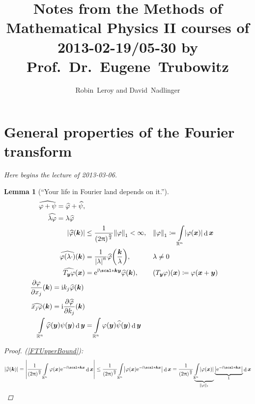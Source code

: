 \documentclass[10pt]{article}
\title{Notes from the Methods of Mathematical Physics II courses of 2013-02-19{\slash}05-30 by Prof.~Dr.~Eugene~Trubowitz}
\author{Robin~Leroy and David~Nadlinger}
\newtheorem*{lemma}{Lemma}
\DeclarePairedDelimiter\norm{\Vert}{\Vert}
\DeclarePairedDelimiter\abs{\lvert}{\rvert}
\DeclarePairedDelimiter\of{\lparen}{\rparen}
\newcommand{\R}{\mathbb{R}}
\newcommand{\Rn}{{\R^n}}
\DeclareMathOperator{\diffd}{d}
\newcommand\gl\lambda
\newcommand\gj\varphi
\newcommand\gy\psi
\newcommand{\bx}{{\vectorsym x}}
\newcommand{\by}{{\vectorsym y}}
\newcommand{\bk}{{\vectorsym k}}
\newcommand\ft\widehat
\newcommand\Int[1]{\int\limits_#1}
\newcommand\fstpartial[2][]{\frac{\partial #1}{\partial #2}}
\newcommand\I{\mathrm{i}}
\newcommand\E{\mathrm{e}}
\newcommand{\ftnrm}{\frac{1}{\of*{2\pi}^\frac{n}{2}} }
\begin{document}
  \maketitle
  \section{General properties of the Fourier transform}
  \noindent \emph{Here begins the lecture of 2013-03-06.}
  \begin{lemma}[``Your life in Fourier land depends on it.'']
    \begin{align}
      \label{FTLinearity}
      \begin{split}      
      \ft{\gj + \gy} &= \ft{\gj} + \ft{\gy},\\
      \ft{\gl \gj} &= \gl \ft{\gj} 
      \end{split}
      \\
      \label{FTUpperBound}
      \abs*{\ft{\gj}(\bk)} &\leq \frac{1}{\of*{2\pi}^\frac{n}{2}}\norm*{\gj}_1<\infty, &&
      \norm*{\gj}_1 \coloneqq \Int\Rn \abs*{\gj(\bx)} \diffd \bx
      \\
      \label{FTScaling}
      \ft{\gj\of*{\gl\cdot}}\of*\bk &= \frac{1}{\abs*{\gl}^n}\ft{\gj}\of*{\frac\bk\gl}, &&
      \gl\neq 0
      \\
      \label{FTTranslation}
      \ft{T_\by\gj}\of*\bx &= \E^{\I\scal*\bk\by}\ft\gj\of*\bk, &&
      \of*{T_\by\gj}\of*\bx \coloneqq \gj\of*{\bx+\by}
      \\
      \label{FTDerivative}
      \begin{split}
      \fstpartial[\gj]{x_j}\of*\bk &= \I k_j \ft\gj\of*\bk \\ 
      \ft{x_j \gj}\of*\bk &= \I \fstpartial[\ft\gj]{k_j} \of*\bk
      \end{split}
      \\
      \label{FTUnitary}
      \Int\Rn\ft\gj\of*\by \gy\of*\by \diffd\by &= \Int\Rn \gj\of*\by \ft\gy\of*\by \diffd\by
    \end{align}
    \begin{proof}
      (\ref{FTUpperBound}):
      \begin{equation*}
       \abs*{\ft\gj\of*\bk} 
        = \abs*{\ftnrm\Int\Rn \gj\of*\bx \E^{-\I \scal*\bk\bx}\diffd\bx} 
        \leq \ftnrm\Int\Rn \abs*{ \gj\of*\bx 
        \E^{-\I \scal*\bk\bx}}\diffd\bx  = \frac{1}{\of*{2\pi}^\frac{n}{2}}
        \underbrace{\Int\Rn \abs*{\gj\of*\bx}}_{\norm{\gj}_1}
        \underbrace{\abs*{\E^{-\I\scal*\bk\bx}}}_{1}\diffd\bx \\

\end{equation*}
\end{proof}
\end{lemma}
\end{document}
